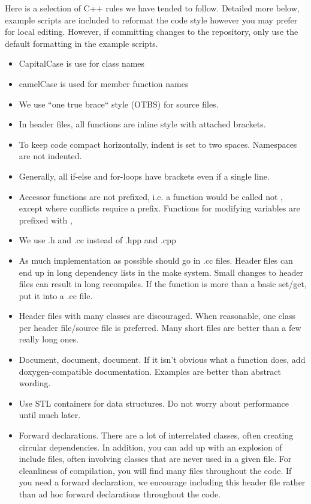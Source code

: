 Here is a selection of C++ rules we have tended to follow.
Detailed more below, example scripts are included to reformat the code style however you may prefer for local editing.
However, if committing changes to the repository, only use the default formatting in the example scripts.
\begin{itemize}
\item CapitalCase is use for class names
\item camelCase is used for member function names
\item We use ``one true brace`` style (OTBS) for source files. 
\item In header files, all functions are inline style with attached brackets.
\item To keep code compact horizontally, indent is set to two spaces. Namespaces are not indented.
\item Generally, all if-else and for-loops have brackets even if a single line.
\item Accessor functions are not prefixed, i.e. a function would be called  not , except
where conflicts require a prefix. Functions for modifying variables are prefixed with ,
\item We use .h and .cc instead of .hpp and .cpp
\item As much implementation as possible should go in .cc files.
	Header files can end up in long dependency lists in the make system.  
	Small changes to header files can result in long recompiles.
	If the function is more than a basic set/get, put it into a .cc file.
\item Header files with many classes are discouraged.  When reasonable, one class per header file/source file is preferred.
	 Many short files are better than a few really long ones.
\item Document, document, document.  If it isn't obvious what a function does, add doxygen-compatible documentation.
	Examples are better than abstract wording.
\item Use STL containers for data structures.  Do not worry about performance until much later.
\item Forward declarations.  There are a lot of interrelated classes, often creating circular dependencies. In addition, you can add up with an explosion of include files, often involving classes that are never used in a given  file.  For cleanliness of compilation, you will find many  files throughout the code. If you need a forward declaration, we encourage including this header file rather than ad hoc forward declarations throughout the code.
\end{itemize}

